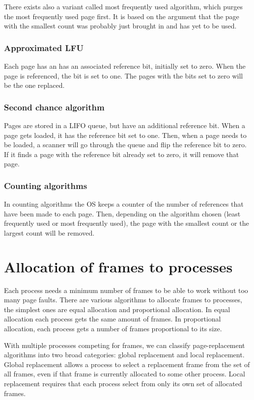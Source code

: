 There exists also a variant called most frequently used algorithm, which purges the most frequently used page first. It is based on the argument that the page with the smallest count was probably just brought in and has yet to be used.

\subsubsection{Approximated LFU}
Each page has an has an associated reference bit, initially set to zero. When the page is referenced, the bit is set to one. The pages with the bits set to zero will be the one replaced.

\subsubsection{Second chance algorithm}
Pages are stored in a LIFO queue, but have an additional reference bit. When a page gets loaded, it has the reference bit set to one. Then, when a page needs to be loaded, a scanner will go through the queue and flip the reference bit to zero. If it finds a page with the reference bit already set to zero, it will remove that page.

\subsubsection{Counting algorithms}
In counting algorithms the OS keeps a counter of the number of references that have been made to each page. Then, depending on the algorithm chosen (least frequently used or most frequently used), the page with the smallest count or the largest count will be removed.

\section{Allocation of frames to processes}
Each process needs a minimum number of frames to be able to work without too many page faults. There are various algorithms to allocate frames to processes, the simplest ones are equal allocation and proportional allocation. In equal allocation each process gets the same amount of frames. In proportional allocation, each process gets a number of frames proportional to its size.

With multiple processes competing for frames, we can classify page-replacement algorithms into two broad categories: global replacement and local replacement. Global replacement allows a process to select a replacement frame from the set of all frames, even if that frame is currently allocated to some other process. Local replacement requires that each process select from only its own set of allocated frames.

